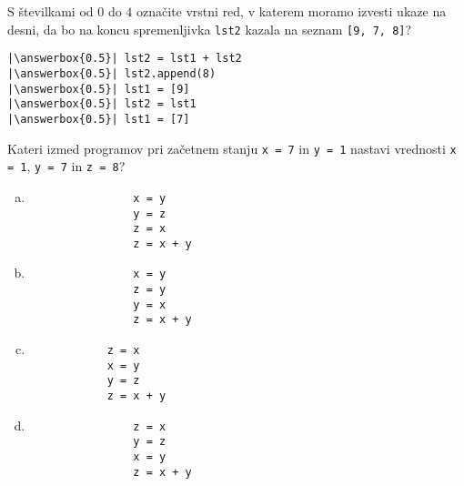 \documentclass[arhiv, 10pt]{../izpit}
\newcommand{\inlinepy}[1]{\texttt{#1}}
\newcommand{\answerbox}[1]{\framebox{\vphantom{\large M}\hspace{#1cm}}}
\begin{document}
        \naloga*
        \begin{multicols}{2}
        \noindent 
        S številkami od $0$ do $4$ označite vrstni red, v katerem moramo izvesti ukaze na desni, da bo na koncu spremenljivka \inlinepy{lst2} kazala na seznam \inlinepy{[9, 7, 8]}?
    
        \columnbreak
        \noindent
        \begin{verbatim}
|\answerbox{0.5}| lst2 = lst1 + lst2
|\answerbox{0.5}| lst2.append(8)
|\answerbox{0.5}| lst1 = [9]
|\answerbox{0.5}| lst2 = lst1
|\answerbox{0.5}| lst1 = [7]

        \end{verbatim}
        \end{multicols}
    
            
        \naloga*
        
        Kateri izmed programov pri začetnem stanju
            \inlinepy{x = 7} in
            \inlinepy{y = 1}
        nastavi vrednosti
            \inlinepy{x = 1},
            \inlinepy{y = 7} in
            \inlinepy{z = 8}?
    
        \begin{multicols}{4}
        \begin{enumerate}[(a)]
\item 
                \begin{verbatim}
                x = y
                y = z
                z = x
                z = x + y
                \end{verbatim}
            
\item 
                \begin{verbatim}
                x = y
                z = y
                y = x
                z = x + y
                \end{verbatim}
            
\item 
            \begin{verbatim}
            z = x
            x = y
            y = z
            z = x + y
            \end{verbatim}
        
\item 
                \begin{verbatim}
                z = x
                y = z
                x = y
                z = x + y
                \end{verbatim}
            
\end{enumerate}

        \end{multicols}
    
\end{document}
